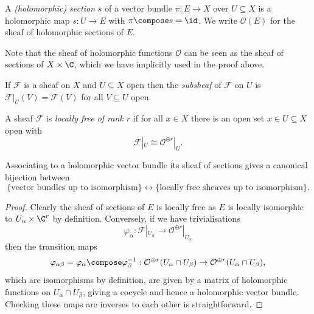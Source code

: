 \documentclass[a4paper]{article}
\begin{document}
\begin{definition}[section]
  A \emph{(holomorphic) section} \(s\) of a vector bundle \(\pi: E \to X\) over \(U \subseteq X\) is a holomorphic map \(s: U \to E\) with \(\pi \compose s = \id\). We write \(\mathcal O(E)\) for the sheaf of holomorphic sections of \(E\).
\end{definition}

Note that the sheaf of holomorphic functions \(\mathcal O\) can be seen as the sheaf of sections of \(X \times \C\), which we have implicitly used in the proof above.

\begin{definition}[subsheaf]
  If \(\mathcal F\) is a sheaf on \(X\) and \(U \subseteq X\) open then the \emph{subsheaf} of \(\mathcal F\) on \(U\) is \(\mathcal F|_U(V) = \mathcal F(V)\) for all \(V \subseteq U\) open.
\end{definition}

\begin{definition}
  A sheaf \(\mathcal F\) is \emph{locally free of rank \(r\)} if for all \(x \in X\) there is an open set \(x \in U \subseteq X\) open with
  \[
    \mathcal F|_U \cong \mathcal O^{\oplus r}|_U.
  \]
\end{definition}

\begin{proposition}
  Associating to a holomorphic vector bundle its sheaf of sections gives a canonical bijection between
\[
  \{\text{vector bundles up to isomorphism}\} \leftrightarrow \{\text{locally free sheaves up to isomorphism}\}.
\]
\end{proposition}

\begin{proof}
  Clearly the sheaf of sections of \(E\) is locally free as \(E\) is locally isomorphic to \(U_\alpha \times \C^r\) by definition. Conversely, if we have trivialisations
  \[
    \varphi_\alpha: \mathcal F|_{U_\alpha} \to \mathcal O^{\oplus r}|_{U_\alpha}
  \]
  then the transition maps
  \[
    \varphi_{\alpha\beta} = \varphi_\alpha \compose \varphi_\beta^{-1}: \mathcal O^{\oplus r} (U_\alpha \cap U_\beta) \to \mathcal O^{\oplus r} (U_\alpha \cap U_\beta),
  \]
  which are isomorphisms by definition, are given by a matrix of holomorphic functions on \(U_\alpha \cap U_\beta\), giving a cocycle and hence a holomorphic vector bundle. Checking these maps are inverses to each other is straightforward.
\end{proof}
\end{document}
